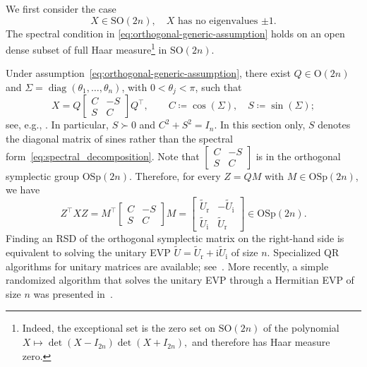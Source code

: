 \documentclass[final,onefignum,onetabnum,dvipsnames]{siamart251216}
\numberwithin{algorithm}{section}
\numberwithin{equation}{section}
\begin{document}
We first consider the case
\begin{equation}
    X\in\mathrm{SO}(2n),
    \quad 
    \text{$X$ has no eigenvalues $\pm 1$}.
    \label{eq:orthogonal-generic-assumption}
\end{equation}
The spectral condition in
\eqref{eq:orthogonal-generic-assumption} holds on an open dense subset
of full Haar measure\footnote{Indeed, the exceptional set is the zero set on $\mathrm{SO}(2n)$ of
the polynomial $
    X\longmapsto \det(X-I_{2n})\det(X+I_{2n}),
$
and therefore has Haar measure zero.} in $\mathrm{SO}(2n)$.

Under assumption~\eqref{eq:orthogonal-generic-assumption}, there exist
$Q\in\mathrm{O}(2n)$ and
$\Sigma=\operatorname{diag}(\theta_1,\ldots,\theta_n)$, with $0<\theta_j<\pi$,
such that
\begin{equation}
    X
    =
    Q
    \begin{bmatrix}
        C & -S\\
        S & C
    \end{bmatrix}
    Q^\top,
    \qquad
    C\coloneq\cos(\Sigma),
    \quad
    S\coloneq\sin(\Sigma);
    \label{eq:orthogonal_rsd}
\end{equation}
see, e.g., \cite[Corollary 2.5.11 (c)]{Horn_Johnson_2012}.
In particular, $S\succ0$ and $C^2+S^2=I_n$.
In this section only,
$S$ denotes the diagonal matrix of sines rather than the spectral
form~\eqref{eq:spectral_decomposition}.
Note that $\left[\begin{smallmatrix}
        C&-S\\
        S&C
    \end{smallmatrix}\right]$ is in the orthogonal symplectic group $\mathrm{OSp}(2n)$. Therefore, for every $Z = QM$ with $M\in\mathrm{OSp}(2n)$, we have
\begin{equation*}
    Z^\top X Z = M^\top \begin{bmatrix}
        C&-S\\
        S&C
    \end{bmatrix} M=\begin{bmatrix}
        \widetilde{U}_\mathrm{r}&-\widetilde{U}_\mathrm{i}\\
        \widetilde{U}_\mathrm{i}&\widetilde{U}_\mathrm{r}
    \end{bmatrix}\in \mathrm{OSp}(2n).
\end{equation*}
Finding an RSD of the orthogonal symplectic matrix on the right-hand side is equivalent to solving the unitary EVP $\widetilde U = \widetilde{U}_\mathrm{r} + \mathrm{i} \widetilde{U}_\mathrm{i}$ of size $n$. Specialized QR algorithms for unitary matrices are available; see~\cite{Gragg1986, Stewart2006}. More recently, a simple randomized algorithm that solves the unitary EVP through a Hermitian EVP of size $n$ was presented in~\cite{HeKressner2025}.
\end{document}
